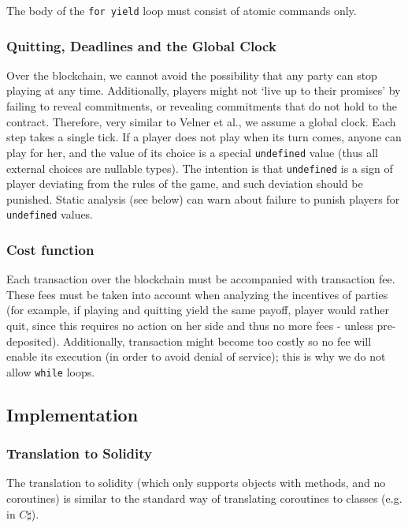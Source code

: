\documentclass[acmsmall,review,anonymous]{acmart}\settopmatter{printfolios=true,printccs=false,printacmref=false}
\begin{document}
The body of the \texttt{for yield} loop must consist of atomic commands only. 

\subsubsection{Quitting, Deadlines and the Global Clock}
Over the blockchain, we cannot avoid the possibility that any party can stop playing at any time. Additionally, players might not `live up to their promises' by failing to reveal commitments, or revealing commitments that do not hold to the contract.
Therefore, very similar to Velner et al., we assume a global clock. Each step takes a single tick. If a player does not play when its turn comes, anyone can play for her, and the value of its choice is a special \texttt{undefined} value (thus all external choices are nullable types). The intention is that \texttt{undefined} is a sign of player deviating from the rules of the game, and such deviation should be punished. Static analysis (see below) can warn about failure to punish players for \texttt{undefined} values.

\subsubsection{Cost function}
Each transaction over the blockchain must be accompanied with transaction fee. These fees must be taken into account when analyzing the incentives of parties (for example, if playing and quitting yield the same payoff, player would rather quit, since this requires no action on her side and thus no more fees - unless pre-deposited). Additionally, transaction might become too costly so no fee will enable its execution (in order to avoid denial of service); this is why we do not allow \texttt{while} loops.

\subsection{Implementation}
\subsubsection{Translation to Solidity}
The translation to solidity (which only supports objects with methods, and no coroutines) is similar to the standard way of translating coroutines to classes (e.g. in $C\sharp$). 
\end{document}
